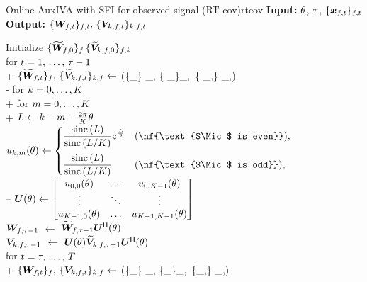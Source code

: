 \documentclass[sip,biber]{now-journal}
\begin{document}
\begin{algorithm}{Online AuxIVA with SFI for observed signal (RT-cov)}{rtcov}
  \textbf{Input:} $\theta$, $\tau$, $\{\Obs _{\ft}\} _{\ft}$ \\
  \textbf{Output:} $\{\Demix _{\ft}\}_{\ft},\, \{\cov _{\src,\ft}\}_{\src,\ft}$
  \begin{pseudo}
    Initialize $\{\widetilde{\bm{W}} _{f,0}\} _{f} \, \{\widetilde{\bm{V}} _{k,f,0}\} _{f,k}$ \\
    for $t = 1,\, \dots,\, \tau - 1$ \\+
      $\{\refpos{\Demix} _{\ft}\}_{\freq},\, \{\refpos{\cov} _{\src,\ft}\} _{\src,\freq} \gets$ (\{\Obs _{\ft}\} _{\freq}, \{ _{\ft[-1]}\}_{\freq},\, \{ _{\src,\ft[-1]}\} _{\src,\freq}) \\-
    for $k = 0, \dots, K$ \\+
      for $m = 0, \dots, K$ \\+
        $L \gets k - m - \frac{2\pi}{K} \theta$ \\
        $\rotmat _{\src,\mic}(\rotSpat) \gets
          \begin{cases}
            \displaystyle \frac{\sinc{(\rotIdx)}}{\sinc{\left(\rotIdx / \Mic\right)}} \twid ^{\frac{\rotIdx}{2}} & (\nf{\text{$\Mic$ is even}}),\\[1em]
            \displaystyle \frac{\sinc{(\rotIdx)}}{\sinc{\left(\rotIdx / \Mic\right)}} & (\nf{\text{$\Mic$ is odd}}),
          \end{cases}
        $ \ct{\eqref{eq:rot:sinc}} \\--
    $\bm{U} (\theta) \gets
      \begin{bmatrix}
        u _{0, 0}(\theta) & \dots & u _{0, K - 1}(\theta) \\
        \vdots & \ddots & \vdots \\
        u _{K - 1, 0}(\theta) & \dots & u _{K - 1, K - 1}(\theta)
      \end{bmatrix}
      $ \ct{\eqref{eq:rotmat}} \\
    {$\bm{W} _{f,\tau - 1}$}    $\gets$ $\widetilde{\bm{W}} _{f,\tau - 1} \bm{U} ^{\mathsf{H}} (\theta)$ \ct{$(\forall \freq)$} \\
    {$\bm{V} _{k,f,\tau - 1}$} $\gets$ $\bm{U} (\theta) \widetilde{\bm{V}} _{k,f,\tau - 1} \bm{U} ^{\mathsf{H}} (\theta)$ \ct{$(\forall \src,\freq)$} \\
    for $t = \tau,\, \dots,\, T$ \\+
      $\{\Demix _{\ft}\}_{\freq},\, \{\cov _{\src,\ft}\} _{\src,\freq} \gets$ (\{\Obs _{\ft}\} _{\freq}, \{\Demix _{\ft[-1]}\}_{\freq},\, \{\cov _{\src,\ft[-1]}\} _{\src,\freq})
  \end{pseudo}
\end{algorithm}
\end{document}
